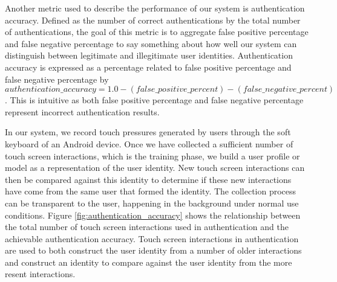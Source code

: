
Another metric used to describe the performance of our system
is authentication accuracy.
%
Defined as the 
number of correct authentications by
the total number of authentications,
the goal of this metric is to
aggregate
false positive percentage and
false negative percentage 
to say something about how well our system can distinguish between
legitimate and illegitimate user identities.
%
Authentication accuracy is 
expressed as a percentage
related to 
false positive percentage and
false negative percentage by
$authentication\_accuracy = 1.0 - (false\_positive\_percent) - (false\_negative\_percent)$.
%
This is intuitive as both 
false positive percentage and
false negative percentage 
represent incorrect authentication results.

%
In our system, we record touch pressures generated by 
users through the soft keyboard of an Android device. 
Once we have collected a sufficient number of touch screen interactions, 
which is the training phase, we build 
a user profile or model
as a representation of the user identity.
%
New touch screen interactions can then be compared
against this identity to determine if
these new interactions have come from the same user
that formed the identity.
%
The collection process can be transparent to the user,
happening in the background under normal use conditions.
%
Figure \ref{fig:authentication_accuracy} 
shows the relationship between
the total number of touch screen interactions used in authentication
and the achievable authentication accuracy.
%
Touch screen interactions in authentication
are used to both
construct the user identity from a number of older interactions and
construct an identity to compare against the user identity 
from the more resent interactions.

